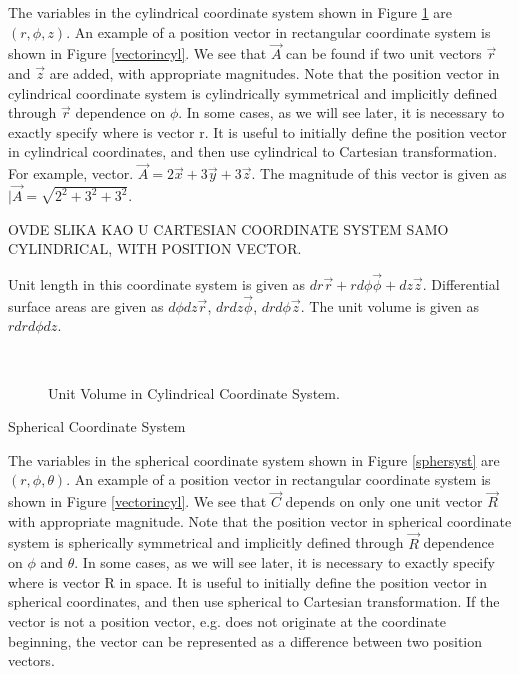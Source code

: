 \begin{description}
The variables in the cylindrical coordinate system shown in Figure \ref{cylsyst} are $(r,\phi,z)$. An example of a position vector in rectangular coordinate system is shown in Figure \ref{vectorincyl}. We see that $\vec{A}$ can be found if two unit vectors $\vec{r}$ and $\vec{z}$ are added, with appropriate magnitudes. Note that the position vector in cylindrical coordinate system is cylindrically symmetrical and implicitly defined through $\vec{r}$ dependence on $\phi$. In some cases, as we will see later, it is necessary to exactly specify where is vector r. It is useful to initially define the position vector in cylindrical coordinates, and then use cylindrical to Cartesian transformation. For example, vector. $\vec{A} = 2 \vec{x} +3 \vec{y}+ 3 \vec{z}  $. The magnitude of this vector is given as $|\vec{A} = \sqrt{2^2+3^2+3^2}$. 

OVDE SLIKA KAO U CARTESIAN COORDINATE SYSTEM SAMO CYLINDRICAL, WITH POSITION VECTOR.



Unit length in this coordinate system is given as $dr \vec{r} + r d\phi \vec{\phi} + dz \vec{z}$. Differential surface areas are given as $d\phi dz \vec{r}$, $dr dz \vec{\phi}$, $dr d\phi \vec{z}$. The unit volume is given as $r dr d\phi dz$.

\begin{figure}[htbp]
\begin{center}
\strut{} \\
\end{center}
\caption{Unit Volume in Cylindrical Coordinate System.}
\label{cylsyst}
\end{figure}




\item{Spherical Coordinate System}





The variables in the spherical coordinate system shown in Figure \ref{sphersyst} are $(r,\phi,\theta)$. An example of a position vector in rectangular coordinate system is shown in Figure \ref{vectorincyl}. We see that $\vec{C}$ depends on only one unit vector $\vec{R}$ with appropriate magnitude. Note that the position vector in spherical coordinate system is spherically symmetrical and implicitly defined through $\vec{R}$ dependence on $\phi$ and $\theta$. In some cases, as we will see later, it is necessary to exactly specify where is vector R in space. It is useful to initially define the position vector in spherical coordinates, and then use spherical to Cartesian transformation. If the vector is not a position vector, e.g. does not originate at the coordinate beginning, the vector can be represented as a difference between two position vectors.


\end{description}
